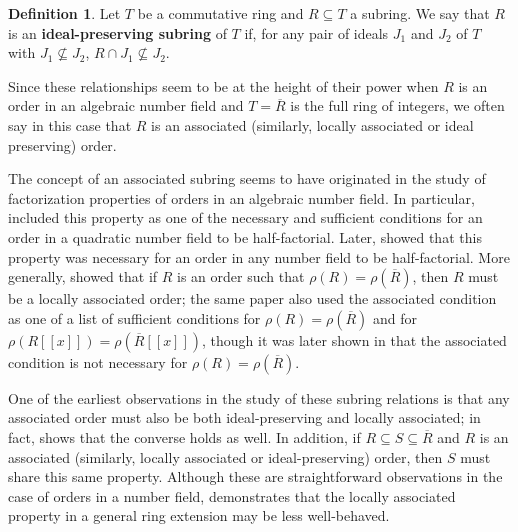 \documentclass[12pt]{amsart}
\theoremstyle{definition}
\newtheorem{definition}[theorem]{Definition}
\newcommand{\Rbar}{{\overline{R}}}
\newcommand{\term}[1]{\textbf{\textup{#1}}}
\begin{document}
\begin{definition}
    \label{ideal-preserving}
    Let $T$ be a commutative ring and $R\subseteq T$ a subring. We say that $R$ is an \term{ideal-preserving subring} of $T$ if, for any pair of ideals $J_1$ and $J_2$ of $T$ with $J_1\nsubseteq J_2$, $R\cap J_1\nsubseteq J_2$.
\end{definition}

Since these relationships seem to be at the height of their power when $R$ is an order in an algebraic number field and $T=\Rbar$ is the full ring of integers, we often say in this case that $R$ is an associated (similarly, locally associated or ideal preserving) order.

The concept of an associated subring seems to have originated in the study of factorization properties of orders in an algebraic number field. In particular, \cite[Theorem 6]{halter-koch} included this property as one of the necessary and sufficient conditions for an order in a quadratic number field to be half-factorial. Later, \cite[Theorem 1.1]{rago} showed that this property was necessary for an order in any number field to be half-factorial. More generally, \cite[Corollary 3.5]{radicalconductor} showed that if $R$ is an order such that $\rho(R)=\rho(\Rbar)$, then $R$ must be a locally associated order; the same paper also used the associated condition as one of a list of sufficient conditions for $\rho(R)=\rho(\Rbar)$ and for $\rho(R[[x]])=\rho(\Rbar[[x]])$, though it was later shown in \cite[Proposition 4.3]{SRelativeDavenport} that the associated condition is not necessary for $\rho(R)=\rho(\Rbar)$.

One of the earliest observations in the study of these subring relations is that any associated order must also be both ideal-preserving and locally associated; in fact, \cite[Corollary 4.13]{subringrelations} shows that the converse holds as well. In addition, if $R\subseteq S\subseteq \Rbar$ and $R$ is an associated (similarly, locally associated or ideal-preserving) order, then $S$ must share this same property. Although these are straightforward observations in the case of orders in a number field, \cite[Theorem 2.11]{subringrelations} demonstrates that the locally associated property in a general ring extension may be less well-behaved.
\end{document}
